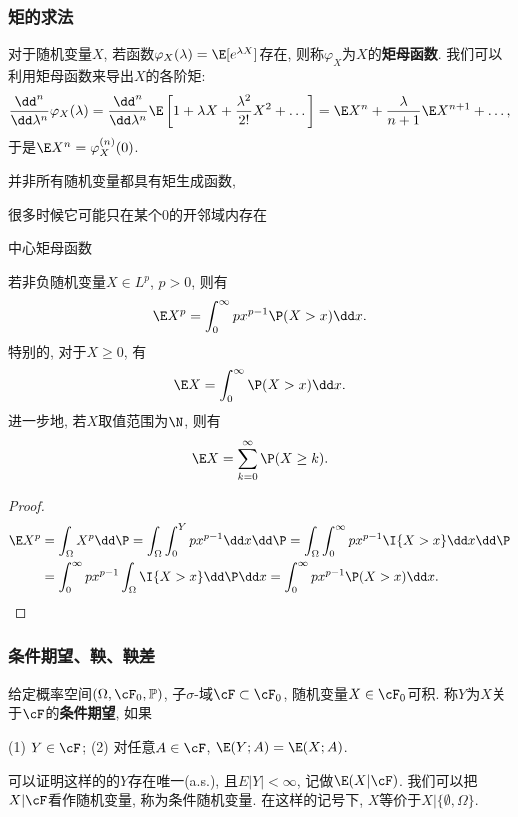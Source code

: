 \subsubsection{矩的求法}

对于随机变量$X$, 若函数$\varphi_X(\lambda) = \E[e^{\lambda X}]$存在, 则称$\varphi_X$为$X$的\textbf{矩母函数}.
我们可以利用矩母函数来导出$X$的各阶矩: 
\begin{equation*}
	\frac{\dd^n}{\dd \lambda^n} \varphi_X(\lambda)
	= \frac{\dd^n}{\dd \lambda^n} \E \left[ 1 + \lambda X + \frac{\lambda^2}{2!} X^2 + \dots \right]
	= \E X^n + \frac{\lambda}{n + 1} \E X^{n+1} + \dots, 
\end{equation*}
于是$\E X^n = \varphi_X^{(n)}(0)$. 

并非所有随机变量都具有矩生成函数, 

很多时候它可能只在某个$0$的开邻域内存在

中心矩母函数


\begin{lemma}\label{lemma:trickOfExpectation}
	若非负随机变量$X \in L^p$, $p > 0$, 则有
	\begin{equation}
		\E X^p = \int_0^{\infty} p x^{p-1} \P(X > x) \dd x. 
	\end{equation}
	特别的, 对于$X \geq 0$, 有
	\begin{equation*}
		\E X = \int_0^{\infty} \P(X > x) \dd x. 
	\end{equation*}
	进一步地, 若$X$取值范围为$\N$, 则有
	\begin{equation*}
		\E X = \sum_{k=0}^{\infty} \P(X \geq k). 
	\end{equation*}
\end{lemma}
\begin{proof}
	\begin{align*}
		\E X^p 
		&= \int_\Omega X^p \dd \P 
		= \int_\Omega \int_0^Y p x^{p-1} \dd x \dd \P 
		= \int_\Omega \int_0^{\infty} p x^{p-1} \I{X > x} \dd x \dd \P \\
		&= \int_0^{\infty} p x^{p-1} \int_\Omega \I{X > x} \dd \P \dd x
		= \int_0^{\infty} p x^{p-1} \P(X > x) \dd x.
	\end{align*}
\end{proof}


\subsubsection{条件期望、鞅、鞅差}

给定概率空间$(\Omega, \cF_0, \mathbb{P})$, 子$\sigma$-域$\cF \subset \cF_0$, 随机变量$X \in \cF_0$可积. 
称$Y$为$X$关于$\cF$的\textbf{条件期望}, 如果
\begin{center}
	(1) $Y \in \cF$; \quad
	(2) 对任意$A \in \cF$, $\E(Y;A) = \E(X;A)$. 
\end{center}
可以证明这样的的$Y$存在唯一(a.s.), 且$E|Y| < \infty$, 记做$\E(X|\cF)$. 
我们可以把$X | \cF$看作随机变量, 称为条件随机变量. 
在这样的记号下, $X$等价于$X | \{\emptyset, \Omega\}$. 

